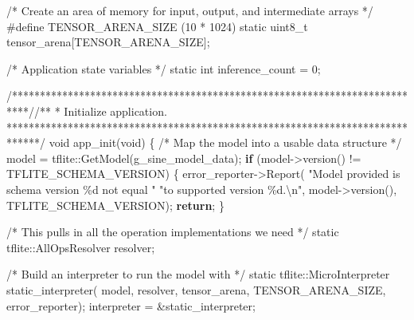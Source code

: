 \documentclass[
  9pt,
  letterpaper,
  abstract,
  titlepage]{scrbook}
\newenvironment{Shaded}{\begin{snugshade}}{\end{snugshade}}
\newcommand{\CommentTok}[1]{\textcolor[rgb]{0.37,0.37,0.37}{#1}}
\newcommand{\ControlFlowTok}[1]{\textcolor[rgb]{0.00,0.23,0.31}{\textbf{#1}}}
\newcommand{\DataTypeTok}[1]{\textcolor[rgb]{0.68,0.00,0.00}{#1}}
\newcommand{\DecValTok}[1]{\textcolor[rgb]{0.68,0.00,0.00}{#1}}
\newcommand{\NormalTok}[1]{\textcolor[rgb]{0.00,0.23,0.31}{#1}}
\newcommand{\OperatorTok}[1]{\textcolor[rgb]{0.37,0.37,0.37}{#1}}
\newcommand{\PreprocessorTok}[1]{\textcolor[rgb]{0.68,0.00,0.00}{#1}}
\newcommand{\SpecialCharTok}[1]{\textcolor[rgb]{0.37,0.37,0.37}{#1}}
\newcommand{\StringTok}[1]{\textcolor[rgb]{0.13,0.47,0.30}{#1}}
\begin{document}
\begin{Shaded}
\begin{Highlighting}[]
\CommentTok{/* Create an area of memory for input, output, and intermediate arrays */}
\PreprocessorTok{\#define TENSOR\_ARENA\_SIZE }\OperatorTok{(}\DecValTok{10}\PreprocessorTok{ }\OperatorTok{*}\PreprocessorTok{ }\DecValTok{1024}\OperatorTok{)}
\DataTypeTok{static} \DataTypeTok{uint8\_t}\NormalTok{ tensor\_arena}\OperatorTok{[}\NormalTok{TENSOR\_ARENA\_SIZE}\OperatorTok{];}

\CommentTok{/* Application state variables */}
\DataTypeTok{static} \DataTypeTok{int}\NormalTok{ inference\_count }\OperatorTok{=} \DecValTok{0}\OperatorTok{;}

\CommentTok{/***************************************************************************//**}
\CommentTok{ * Initialize application.}
\CommentTok{ ******************************************************************************/}
\DataTypeTok{void}\NormalTok{ app\_init}\OperatorTok{(}\DataTypeTok{void}\OperatorTok{)}
\OperatorTok{\{}
  \CommentTok{/* Map the model into a usable data structure */}
\NormalTok{  model }\OperatorTok{=}\NormalTok{ tflite}\OperatorTok{::}\NormalTok{GetModel}\OperatorTok{(}\NormalTok{g\_sine\_model\_data}\OperatorTok{);}
  \ControlFlowTok{if} \OperatorTok{(}\NormalTok{model}\OperatorTok{{-}\textgreater{}}\NormalTok{version}\OperatorTok{()} \OperatorTok{!=}\NormalTok{ TFLITE\_SCHEMA\_VERSION}\OperatorTok{)} \OperatorTok{\{}
\NormalTok{    error\_reporter}\OperatorTok{{-}\textgreater{}}\NormalTok{Report}\OperatorTok{(}
        \StringTok{"Model provided is schema version }\SpecialCharTok{\%d}\StringTok{ not equal "}
        \StringTok{"to supported version }\SpecialCharTok{\%d}\StringTok{.}\SpecialCharTok{\textbackslash{}n}\StringTok{"}\OperatorTok{,}
\NormalTok{        model}\OperatorTok{{-}\textgreater{}}\NormalTok{version}\OperatorTok{(),}\NormalTok{ TFLITE\_SCHEMA\_VERSION}\OperatorTok{);}
    \ControlFlowTok{return}\OperatorTok{;}
  \OperatorTok{\}}

  \CommentTok{/* This pulls in all the operation implementations we need */}
  \DataTypeTok{static}\NormalTok{ tflite}\OperatorTok{::}\NormalTok{AllOpsResolver resolver}\OperatorTok{;}

  \CommentTok{/* Build an interpreter to run the model with */}
  \DataTypeTok{static}\NormalTok{ tflite}\OperatorTok{::}\NormalTok{MicroInterpreter static\_interpreter}\OperatorTok{(}
\NormalTok{      model}\OperatorTok{,}\NormalTok{ resolver}\OperatorTok{,}\NormalTok{ tensor\_arena}\OperatorTok{,}\NormalTok{ TENSOR\_ARENA\_SIZE}\OperatorTok{,}\NormalTok{ error\_reporter}\OperatorTok{);}
\NormalTok{  interpreter }\OperatorTok{=} \OperatorTok{\&}\NormalTok{static\_interpreter}\OperatorTok{;}


\end{Highlighting}
\end{Shaded}
\end{document}
